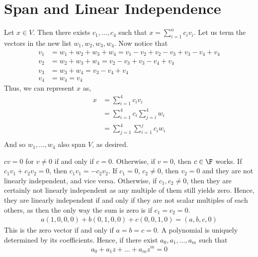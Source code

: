 \documentclass{book}
\begin{document}
\section{Span and Linear Independence}
  \begin{enumerate}[label=\arabic*)]
      \ii Let $x \in V$. Then there exists $c_1, \dots, c_4$ such that $x = \sum_{i = 1}^{n}c_iv_i$. Let us term the vectors in the new list $w_1, w_2, w_3, w_4$. Now notice
      that
      \begin{align*}
        v_1 & = w_1 + w_2 + w_3 + w_4 = v_1 - v_2 + v_2 - v_3 + v_3 - v_4 + v_4 \\
        v_2 & = w_2 + w_3 + w_4 = v_2 - v_3 + v_3 - v_4 + v_4 \\
        v_3 & = w_3 + w_4 = v_3 - v_4 + v_4 \\
        v_4 & = w_4 = v_4
      \end{align*}
      Thus, we can represent $x$ as,
      \begin{align*}
        x & = \sum_{i = 1}^{4}c_iv_i \\
        & = \sum_{i = 1}^{4}c_i\sum_{j = i}^{4}w_i\\
        & = \sum_{j = 1}^{4}\sum_{i = 1}^{j}c_iw_i\\
      \end{align*}
      And so $w_1, \dots, w_4$ also span $V$, as desired.
      \ii
        \begin{enumerate}[label=\arabic*)]
          \ii $cv = 0$ for $v \neq 0$ if and only if $c = 0$. Otherwise, if $v = 0$, then $c \in \F$ works.
          \ii If $c_1v_1 + c_2v_2 = 0$, then $c_1v_1 = -c_2v_2$. If $c_1 = 0$, $c_2 \neq 0$, then $v_2 = 0$ and they are not linearly independent, and vice versa. Otherwise,
          if $c_1, c_2 \neq 0$, then they are certainly not linearly independent as any multiple of them still yields zero. Hence, they are linearly independent if and only if
          they are not scalar multiples of each others, as then the only way the sum is zero is if $c_1 = c_2 = 0$.
          \ii 
            \begin{align*}
              a(1, 0, 0, 0) + b(0, 1, 0, 0) + c(0, 0, 1, 0) = (a, b, c, 0)
            \end{align*}
            This is the zero vector if and only if $a = b = c = 0$.
          \ii
            A polynomial is uniquely determined by its coefficients. Hence, if there exist $a_0, a_1, \dots, a_m$ such that
            \begin{align*}
              a_0 + a_1z + \dots + a_mz^m = 0

\end{align*}
\end{enumerate}
\end{enumerate}
\end{document}
